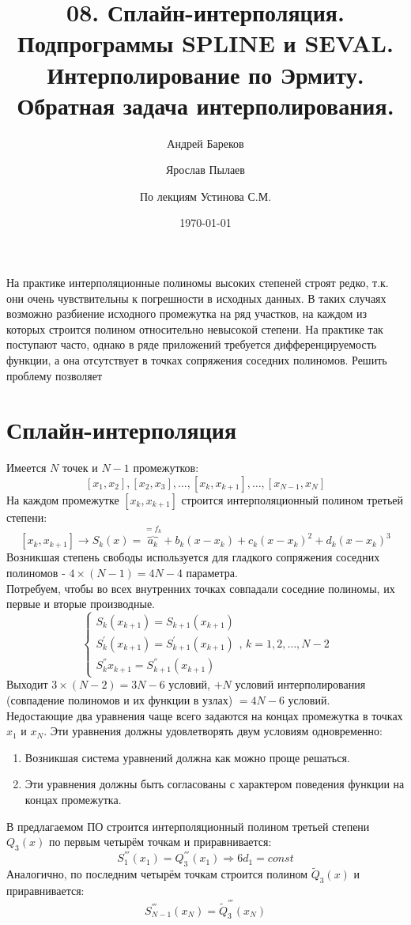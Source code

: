 \documentclass[a4paper,11pt]{article}
\title{08. Сплайн-интерполяция. Подпрограммы \textbf{SPLINE} и \textbf{SEVAL}. Интерполирование по Эрмиту. Обратная задача интерполирования.}
\author{Андрей Бареков \and Ярослав Пылаев \and По лекциям Устинова С.М.}
\date{\today}
\begin{document}
\maketitle
\newpage

На практике интерполяционные полиномы высоких степеней строят редко, т.к. они очень чувствительны к погрешности в исходных данных. В таких случаях возможно разбиение
  исходного промежутка на ряд участков, на каждом из которых строится полином относительно невысокой степени. На практике так поступают часто, однако в ряде приложений
  требуется дифференцируемость функции, а она отсутствует в точках сопряжения соседних полиномов. Решить проблему позволяет

\section{Сплайн-интерполяция}
Имеется $N$ точек и $N-1$ промежутков:
\[[x_1, x_2], [x_2, x_3], \dots, [x_k, x_{k+1}], \dots, [x_{N-1}, x_N]\]
На каждом промежутке $[x_k, x_{k+1}]$ строится интерполяционный полином третьей степени:
\[[x_k, x_{k+1}] \rightarrow S_k(x) = \overbrace{a_k}^{=f_k} + b_k(x-x_k) + c_k(x-x_k)^2 + d_k(x-x_k)^3\]
Возникшая степень свободы используется для гладкого сопряжения соседних полиномов - \(4 \times (N - 1) = 4N - 4\) параметра. \\
Потребуем, чтобы во всех внутренних точках совпадали соседние полиномы, их первые и вторые производные.
\begin{equation*}
  \begin{cases}
    S_k(x_{k+1}) = S_{k+1}(x_{k+1}) \\
    S^{'}_k(x_{k+1}) = S^{'}_{k+1}(x_{k+1}) \\
    S^{''}_k{x_{k+1}} = S^{''}_{k+1}(x_{k+1})
  \end{cases},\, k = 1, 2, \dots, N - 2
\end{equation*}
Выходит \(3 \times (N - 2) = 3N - 6\) условий, $+N$ условий интерполирования (совпадение полиномов и их функции в узлах) $=4N-6$ условий. \\
Недостающие два уравнения чаще всего задаются на концах промежутка в точках $x_1$ и $x_N$. Эти уравнения должны удовлетворять двум условиям одновременно:
\begin{enumerate}
  \item Возникшая система уравнений должна как можно проще решаться. 
  \item Эти уравнения должны быть согласованы с характером поведения функции на концах промежутка.
\end{enumerate}
В предлагаемом ПО строится интерполяционный полином третьей степени $Q_3(x)$ по первым четырём точкам и приравнивается:
\[ S^{'''}_1(x_1) = Q^{'''}_3(x_1) \Rightarrow 6d_1 = const\]
Аналогично, по последним четырём точкам строится полином $\widetilde{Q}_3(x)$ и приравнивается:
\[ S^{'''}_{N - 1}(x_N) = \widetilde{Q}^{'''}_3(x_N) \]
\end{document}
